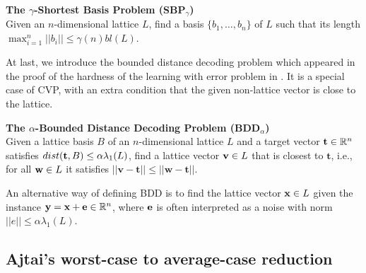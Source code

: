 \documentclass[../main.tex]{subfiles}
\begin{document}
\begin{tcolorbox}
\noindent
\textbf{The $\gamma$-Shortest Basis Problem (SBP$_{\gamma}$)}\\
Given an $n$-dimensional lattice $L$, find a basis $\{b_1, \dots, b_n\}$ of $L$ such that its length $\max_{i=1}^n ||b_i|| \le \gamma(n) bl(L)$.
\end{tcolorbox}

At last, we introduce the bounded distance decoding problem which appeared in the proof of the hardness of the learning with error problem in \citep{regev2009lattices}. It is a special case of CVP, with an extra condition that the given non-lattice vector is close to the lattice. 
\begin{tcolorbox}
\noindent
\textbf{The $\alpha$-Bounded Distance Decoding Problem (BDD$_{\alpha}$) }\\
Given a lattice basis $B$ of an $n$-dimensional lattice $L$ and a target vector $\mathbf{t} \in \mathbb{R}^n$ satisfies $dist(\mathbf{t},B) \le \alpha \lambda_1(L)$, find a lattice vector $\mathbf{v} \in L$ that is closest to $\mathbf{t}$, i.e., for all $\mathbf{w} \in L$ it satisfies $||\mathbf{v} - \mathbf{t}|| \le ||\mathbf{w} - \mathbf{t}||$. 
\end{tcolorbox}
An alternative way of defining BDD is to find the lattice vector $\mathbf{x} \in L$ given the instance $\mathbf{y} = \mathbf{x} + \mathbf{e} \in \mathbb{R}^n$, where $\mathbf{e}$ is often interpreted as a noise with norm $||e|| \le \alpha \lambda_1(L)$.






\subsection{Ajtai's worst-case to average-case reduction}
\end{document}
